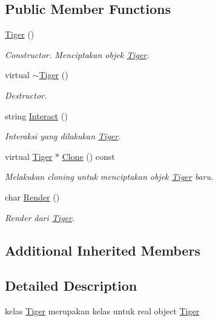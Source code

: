 \subsection*{Public Member Functions}
\begin{DoxyCompactItemize}
\item 
\hyperlink{classTiger_ab2b455a0cdbd21f2052eef2a176f0eeb}{Tiger} ()
\begin{DoxyCompactList}\small\item\em Constructor. Menciptakan objek \hyperlink{classTiger}{Tiger}. \end{DoxyCompactList}\item 
virtual \hyperlink{classTiger_ae9a0109993b438dd7405b4018ba62d4b}{$\sim$\+Tiger} ()
\begin{DoxyCompactList}\small\item\em Destructor. \end{DoxyCompactList}\item 
string \hyperlink{classTiger_ae318cc373300a52e13598f42368a2c70}{Interact} ()
\begin{DoxyCompactList}\small\item\em Interaksi yang dilakukan \hyperlink{classTiger}{Tiger}. \end{DoxyCompactList}\item 
virtual \hyperlink{classTiger}{Tiger} $\ast$ \hyperlink{classTiger_aa376d57a4b2d56edb586f7ba1b170037}{Clone} () const 
\begin{DoxyCompactList}\small\item\em Melakukan cloning untuk menciptakan objek \hyperlink{classTiger}{Tiger} baru. \end{DoxyCompactList}\item 
char \hyperlink{classTiger_a42b09a0bfc8c115e7383e926513fb371}{Render} ()
\begin{DoxyCompactList}\small\item\em Render dari \hyperlink{classTiger}{Tiger}. \end{DoxyCompactList}\end{DoxyCompactItemize}
\subsection*{Additional Inherited Members}


\subsection{Detailed Description}
kelas \hyperlink{classTiger}{Tiger} merupakan kelas untuk real object \hyperlink{classTiger}{Tiger} 

